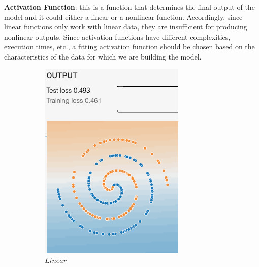 \documentclass[12pt,a4paper]{article}
\begin{document}
\begin{enumerate}
		\noindent \textbf{\small Activation Function}: this is a function that determines the final output of the model and it could either a linear or a nonlinear function. Accordingly, since linear functions only work with linear data, they are insufficient for producing nonlinear outputs. Since activation functions have different complexities, execution times, etc., a fitting activation function should be chosen based on the characteristics of the data for which we are building the model. 
		\begin{figure}[H]
			\centering
			\begin{subfigure}[H]{0.2\textwidth}
				\centering
				\includegraphics[width=\textwidth]{Figures/activation/linear}
				\caption{$Linear$}
			\end{subfigure}
			\begin{subfigure}[H]{0.2\textwidth}
				\centering

\end{subfigure}
\end{figure}
\end{enumerate}
\end{document}
